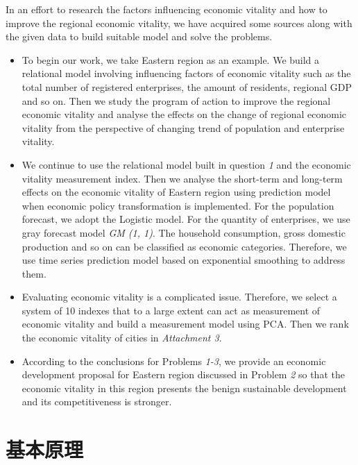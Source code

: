 \documentclass{apmcmthesis}
\begin{document}
\hspace{2em}In an effort to research the factors influencing economic vitality and how to improve the regional economic vitality, we have acquired some sources along with the given data to build suitable model and solve the problems.
\begin{itemize}
  \item To begin our work, we take Eastern region as an example. We build a relational model involving influencing factors of economic vitality such as the total number of registered enterprises, the amount of residents, regional GDP and so on. Then we study the program of action to improve the regional economic vitality and analyse the effects on the change of regional economic vitality from the perspective of changing trend of population and enterprise vitality.
  \item We continue to use the relational model built in question \textit 1 and the economic vitality measurement index. Then we analyse the short-term and long-term effects on the economic vitality of Eastern region using prediction model when economic policy transformation is implemented. For the population forecast, we adopt the Logistic model. For the quantity of enterprises, we use gray forecast model \textit{GM (1, 1)}. The household consumption, gross domestic production and so on can be classified as economic categories. Therefore, we use time series prediction model based on exponential smoothing to address them.
  \item Evaluating economic vitality is a complicated issue. Therefore, we select a system of 10 indexes that to a large extent can act as measurement of economic vitality and build a measurement model using PCA. Then we rank the economic vitality of cities in \textit{Attachment 3}.
  \item According to the conclusions for Problems \textit{1-3}, we provide an economic development proposal for Eastern region discussed in Problem \textit{2} so that the economic vitality in this region presents the benign sustainable development and its competitiveness is stronger.
\end{itemize}

\section{基本原理}
\end{document}
